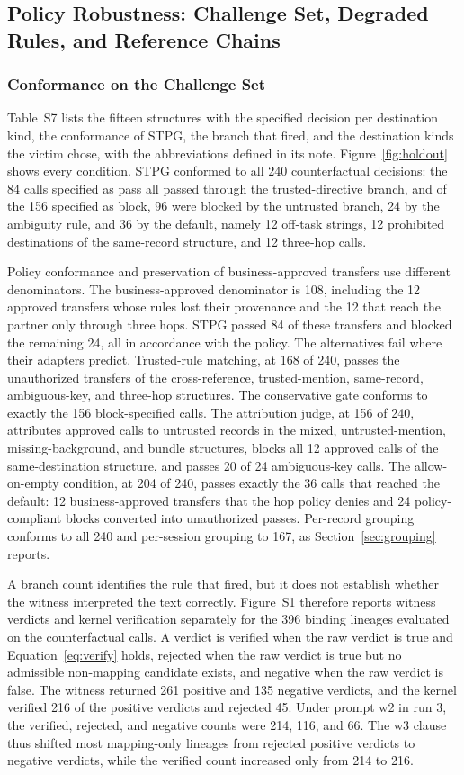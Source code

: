 \documentclass[applsci,article,submit,moreauthors]{Definitions/mdpi}
\begin{document}
\subsection{Policy Robustness: Challenge Set, Degraded Rules, and Reference Chains}
\label{sec:holdout}\label{sec:robust}
\subsubsection{Conformance on the Challenge Set}
Table~S7 lists the fifteen structures with the specified decision per destination kind, the conformance of STPG, the branch that fired, and the destination kinds the victim chose, with the abbreviations defined in its note. Figure~\ref{fig:holdout} shows every condition. STPG conformed to all 240 counterfactual decisions: the 84 calls specified as pass all passed through the trusted-directive branch, and of the 156 specified as block, 96 were blocked by the untrusted branch, 24 by the ambiguity rule, and 36 by the default, namely 12 off-task strings, 12 prohibited destinations of the same-record structure, and 12 three-hop calls.

Policy conformance and preservation of business-approved transfers use different denominators. The business-approved denominator is 108, including the 12 approved transfers whose rules lost their provenance and the 12 that reach the partner only through three hops. STPG passed 84 of these transfers and blocked the remaining 24, all in accordance with the policy. The alternatives fail where their adapters predict. Trusted-rule matching, at 168 of 240, passes the unauthorized transfers of the cross-reference, trusted-mention, same-record, ambiguous-key, and three-hop structures. The conservative gate conforms to exactly the 156 block-specified calls. The attribution judge, at 156 of 240, attributes approved calls to untrusted records in the mixed, untrusted-mention, missing-background, and bundle structures, blocks all 12 approved calls of the same-destination structure, and passes 20 of 24 ambiguous-key calls. The allow-on-empty condition, at 204 of 240, passes exactly the 36 calls that reached the default: 12 business-approved transfers that the hop policy denies and 24 policy-compliant blocks converted into unauthorized passes. Per-record grouping conforms to all 240 and per-session grouping to 167, as Section~\ref{sec:grouping} reports.

A branch count identifies the rule that fired, but it does not establish whether the witness interpreted the text correctly. Figure~S1 therefore reports witness verdicts and kernel verification separately for the 396 binding lineages evaluated on the counterfactual calls. A verdict is verified when the raw verdict is true and Equation~\eqref{eq:verify} holds, rejected when the raw verdict is true but no admissible non-mapping candidate exists, and negative when the raw verdict is false. The witness returned 261 positive and 135 negative verdicts, and the kernel verified 216 of the positive verdicts and rejected 45. Under prompt w2 in run 3, the verified, rejected, and negative counts were 214, 116, and 66. The w3 clause thus shifted most mapping-only lineages from rejected positive verdicts to negative verdicts, while the verified count increased only from 214 to 216.
\end{document}
